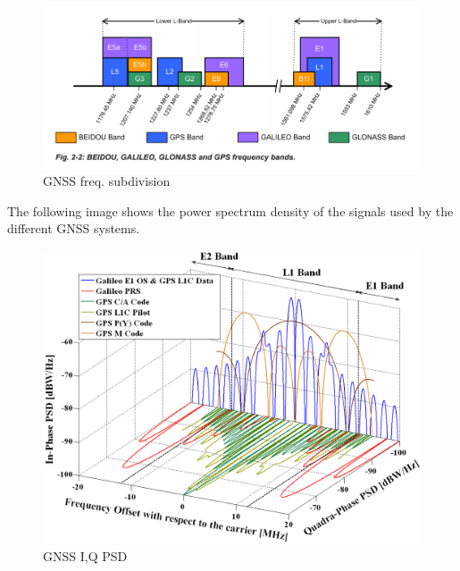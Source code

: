 \documentclass[12pt]{report}
\begin{document}
 \begin{figure}[h!]
    \centering
    \includegraphics[width=16cm]{Pictures/frequencies.png}
    \caption{GNSS freq. subdivision}
\end{figure}

The following image shows the power spectrum density of the signals used by the different GNSS systems.

 \begin{figure}[h!]
    \centering
    \includegraphics[width=16cm]{Pictures/Galileo_Signal_Plan_Fig_3.png}
    \caption{GNSS I,Q PSD}
\end{figure}
\end{document}
